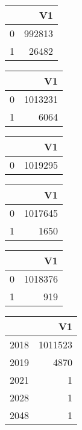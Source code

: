\bigskip\bigskip
\centering
\begin{tabular}{rr}
  \hline
 & V1 \\ 
  \hline
0 & 992813 \\ 
  1 & 26482 \\ 
   \hline
\end{tabular}

\bigskip\bigskip
\centering
\begin{tabular}{rr}
  \hline
 & V1 \\ 
  \hline
0 & 1013231 \\ 
  1 & 6064 \\ 
   \hline
\end{tabular}

\bigskip\bigskip
\centering
\begin{tabular}{rr}
  \hline
 & V1 \\ 
  \hline
0 & 1019295 \\ 
   \hline
\end{tabular}

\bigskip\bigskip
\centering
\begin{tabular}{rr}
  \hline
 & V1 \\ 
  \hline
0 & 1017645 \\ 
  1 & 1650 \\ 
   \hline
\end{tabular}

\bigskip\bigskip
\centering
\begin{tabular}{rr}
  \hline
 & V1 \\ 
  \hline
0 & 1018376 \\ 
  1 & 919 \\ 
   \hline
\end{tabular}

\bigskip\bigskip
\centering
\begin{tabular}{rr}
  \hline
 & V1 \\ 
  \hline
2018 & 1011523 \\ 
  2019 & 4870 \\ 
  2021 &   1 \\ 
  2028 &   1 \\ 
  2048 &   1 \\ 
   \hline
\end{tabular}

